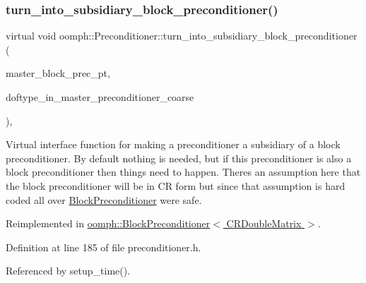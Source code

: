 \subsubsection{\texorpdfstring{turn\+\_\+into\+\_\+subsidiary\+\_\+block\+\_\+preconditioner()}{turn\_into\_subsidiary\_block\_preconditioner()}\hspace{0.1cm}{\footnotesize\ttfamily [1/2]}}
{\footnotesize\ttfamily virtual void oomph\+::\+Preconditioner\+::turn\+\_\+into\+\_\+subsidiary\+\_\+block\+\_\+preconditioner (\begin{DoxyParamCaption}\item[{\hyperlink{classoomph_1_1BlockPreconditioner}{Block\+Preconditioner}$<$ \hyperlink{classoomph_1_1CRDoubleMatrix}{C\+R\+Double\+Matrix} $>$ $\ast$}]{master\+\_\+block\+\_\+prec\+\_\+pt,  }\item[{const \hyperlink{classoomph_1_1Vector}{Vector}$<$ unsigned $>$ \&}]{doftype\+\_\+in\+\_\+master\+\_\+preconditioner\+\_\+coarse }\end{DoxyParamCaption})\hspace{0.3cm}{\ttfamily [inline]}, {\ttfamily [virtual]}}

Virtual interface function for making a preconditioner a subsidiary of a block preconditioner. By default nothing is needed, but if this preconditioner is also a block preconditioner then things need to happen. There\textquotesingle{}s an assumption here that the block preconditioner will be in CR form but since that assumption is hard coded all over \hyperlink{classoomph_1_1BlockPreconditioner}{Block\+Preconditioner} we\textquotesingle{}re safe. 

Reimplemented in \hyperlink{classoomph_1_1BlockPreconditioner_ab8e2478caa8370dd12462f17e1cc8082}{oomph\+::\+Block\+Preconditioner$<$ C\+R\+Double\+Matrix $>$}.



Definition at line 185 of file preconditioner.\+h.



Referenced by setup\+\_\+time().

\mbox{\label{classoomph_1_1Preconditioner_a61a462f4266c22050b4ab9ab441c77a6}} 
